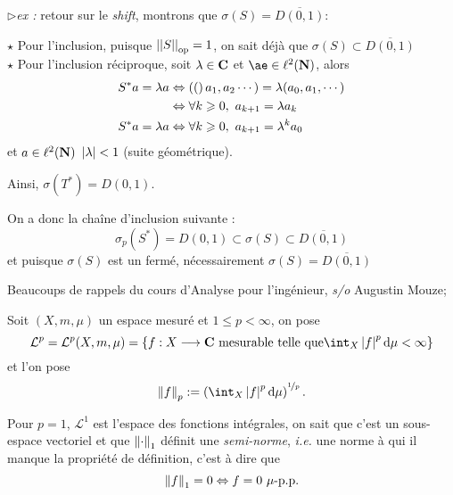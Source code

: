 \documentclass[a4paper,11pt, twoside]{article}
\begin{document}
$\triangleright$\emph{ex :} retour sur le \emph{shift}, montrons que $\sigma(S)=\overline{D(0,1)}$:


\begin{Proof}
  $\star$ Pour l'inclusion, puisque $\left|\left|S\right|\right|_{\mathrm{op}}=1$, on sait déjà que $\sigma(S)\subset\overline{D(0,1)}$\\

  $\star$ Pour l'inclusion réciproque, soit $\lambda\in\mathbf C$ et $æ\in\ell^2(\N)$, alors 
  \begin{align*}
    S^*a=\lambda a&\Leftrightarrow\Par(a_1,a_2\cdots)=\lambda(a_0,a_1,\cdots)\\
    &\Leftrightarrow \forall k\geqslant 0,\ a_{k+1}=\lambda a_k\\
    S^*a=\lambda a&\Leftrightarrow \forall k\geqslant 0,\ a_{k+1}=\lambda^k a_0
  \end{align*}
  et $a\in\ell^2(\mathbf N)$ \ssi $\left| \lambda\right|<1$ (suite géométrique).
  
  Ainsi, $\sigma(T^*)=D(0,1)$.

  On a donc la chaîne d'inclusion suivante : 
  $$\sigma_p(S^*)=D(0,1)\subset \sigma(S)\subset\overline{D(0,1)}$$
  et puisque $\sigma(S)$ est un fermé, nécessairement $\sigma(S)=\overline{D(0,1)}$
\end{Proof}





Beaucoups de rappels du cours d'Analyse pour l'ingénieur, \emph{s/o} Augustin Mouze;


\begin{Def}
  Soit $(X,m,\mu)$ un espace mesuré et $1\leqslant p< \infty$, on pose 
$$\mathcal L^p=\mathcal L^p(X,m,\mu)=\ens{f:X\longrightarrow\C\text{ mesurable telle que}\int_X\abs{f}^p\mathrm d\mu<\infty}$$
et l'on pose 
$$\norm{f}_p:=\left(\int_X\abs{f}^p\mathrm d\mu\right)^{\nicefrac{1}{p}}.$$
\end{Def}


\begin{RQ}
  Pour $p=1$, $\mathcal L^1$ est l'espace des fonctions intégrales, on sait que c'est un sous-espace vectoriel et que $\left\lVert\cdot\right\rVert_1$ définit une \emph{semi-norme}, \emph{i.e.} une norme à qui il manque la propriété de définition, c'est à dire que 
$$\norm{f}_1=0\Leftrightarrow f=0\ \mu\text{-p.p.}$$
\end{RQ}
\end{document}
